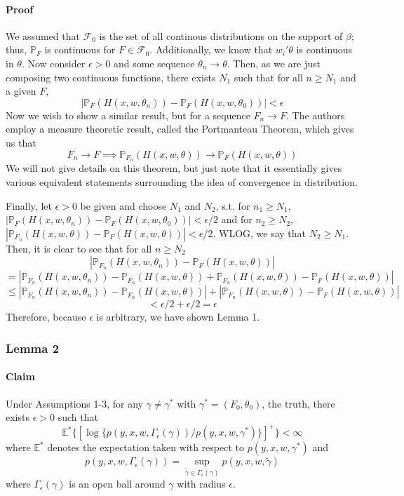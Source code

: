 \documentclass[11pt]{article}
\begin{document}
\paragraph{Proof} We assumed that $\mathcal F_0$ is the set of all continous distributions on the support of $\beta$; thus, $\mathbb P_F$ is continuous for $F\in \mathcal F_0$. Additionally, we know that $w_i'\theta$ is continuous in $\theta$. Now consider $\epsilon >0$ and some sequence $\theta_n\rightarrow\theta$. Then, as we are just composing two continuous functions, there exists $N_1$ such that for all $n\geq N_1$ and a given $F$,
\[
|\mathbb P_{F}(H(x,w,\theta_n))-\mathbb P_F(H(x,w,\theta_0))|<\epsilon
\]
Now we wish to show a similar result, but for a sequence $F_n\rightarrow F$. The authors employ a measure theoretic result, called the Portmanteau Theorem, which gives us that
\[
F_n\rightarrow F \implies \mathbb P_{F_n}(H(x,w,\theta))\rightarrow \mathbb P_{F}(H(x,w,\theta))
\]
We will not give details on this theorem, but just note that it essentially gives various equivalent statements surrounding the idea of convergence in distribution. 

Finally, let $\epsilon>0$ be given and choose $N_1$ and $N_2$, s.t. for $n_1\geq N_1$, $|\mathbb P_{F}(H(x,w,\theta_n))-\mathbb P_F(H(x,w,\theta_0))|<\epsilon/2$ and for $n_2\geq N_2$, $|\mathbb P_{F_n}(H(x,w,\theta))-\mathbb P_F(H(x,w,\theta))|<\epsilon/2$. WLOG, we say that $N_2\geq N_1$. Then, it is clear to see that for all $n\geq N_2$
\[
|\mathbb P_{F_n}(H(x,w,\theta_n)) - \mathbb P_{F}(H(x,w,\theta))|
\]
\[
=|\mathbb P_{F_n}(H(x,w,\theta_n)) - \mathbb P_{F_n}(H(x,w,\theta)) + \mathbb P_{F_n}(H(x,w,\theta)) - \mathbb P_{F}(H(x,w,\theta))|
\]
\[
\leq |\mathbb P_{F_n}(H(x,w,\theta_n)) - \mathbb P_{F_n}(H(x,w,\theta))| + |\mathbb P_{F_n}(H(x,w,\theta)) - \mathbb P_{F}(H(x,w,\theta))|
\]
\[
<\epsilon/2+\epsilon/2=\epsilon
\]
Therefore, because $\epsilon$ is arbitrary, we have shown Lemma 1.

\subsubsection{Lemma 2}

\paragraph{Claim} Under Assumptions 1-3, for any $\gamma\neq\gamma^*$ with $\gamma^*=(F_0,\theta_0)$, the truth, there exists $\epsilon>0$ such that
\[
\mathbb{E}^*\{[\log\{p(y,x,w,\Gamma_\epsilon (\gamma))/p(y,x,w,\gamma^*)\}]^+\}<\infty
\]
where $\mathbb{E}^*$ denotes the expectation taken with respect to $p(y,x,w,\gamma^*)$ and
\[
p(y,x,w,\Gamma_\epsilon (\gamma)) = \sup_{\tilde\gamma\in\Gamma_\epsilon(\gamma)} p(y,x,w,\tilde\gamma)
\]
where $\Gamma_\epsilon(\gamma)$ is an open ball around $\gamma$ with radius $\epsilon$.
\end{document}
